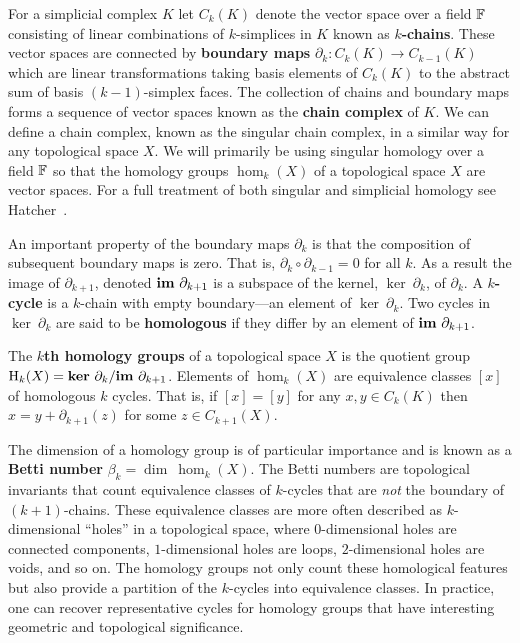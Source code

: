 
For a simplicial complex $K$ let $C_k(K)$ denote the vector space over a field $\mathbb{F}$ consisting of linear combinations of $k$-simplices in $K$ known as \textbf{$k$-chains}.
These vector spaces are connected by \textbf{boundary maps} $\partial_k: C_k(K)\to C_{k-1}(K)$ which are linear transformations taking basis elements of $C_k(K)$ to the abstract sum of basis $(k-1)$-simplex faces.
The collection of chains and boundary maps forms a sequence of vector spaces known as the \textbf{chain complex} of $K$.
We can define a chain complex, known as the singular chain complex, in a similar way for any topological space $X$.
We will primarily be using singular homology over a field $\mathbb{F}$ so that the homology groups $\hom_k(X)$ of a topological space $X$ are vector spaces.
For a full treatment of both singular and simplicial homology see Hatcher~\cite{hatcher01}.

An important property of the boundary maps $\partial_k$ is that the composition of subsequent boundary maps is zero.
That is, $\partial_k\circ\partial_{k-1} = 0$ for all $k$.
As a result the image of $\partial_{k+1}$, denoted $\mathbf{im}~\partial_{k+1}$ is a subspace of the kernel, $\ker~\partial_k$, of $\partial_k$.
A \textbf{$k$-cycle} is a $k$-chain with empty boundary---an element of $\ker~\partial_k$.
Two cycles in $\ker~\partial_k$ are said to be \textbf{homologous} if they differ by an element of $\mathbf{im}~\partial_{k+1}$.

The \textbf{$k$th homology groups} of a topological space $X$ is the quotient group $\mathrm{H}_k(X) = \mathbf{ker}~\partial_k/\mathbf{im}~\partial_{k+1}$.
Elements of $\hom_k(X)$ are equivalence classes $[x]$ of homologous $k$ cycles.
That is, if $[x] = [y]$ for any $x,y\in C_k(K)$ then $x = y +\partial_{k+1}(z)$ for some $z\in C_{k+1}(X)$.

The dimension of a homology group is of particular importance and is known as a \textbf{Betti number} $\beta_k = \dim~\hom_k(X)$.
The Betti numbers are topological invariants that count equivalence classes of $k$-cycles that are \emph{not} the boundary of $(k+1)$-chains.
These equivalence classes are more often described as $k$-dimensional ``holes'' in a topological space, where $0$-dimensional holes are connected components, $1$-dimensional holes are loops, $2$-dimensional holes are voids, and so on.
The homology groups not only count these homological features but also provide a partition of the $k$-cycles into equivalence classes.
In practice, one can recover representative cycles for homology groups that have interesting geometric and topological significance.

